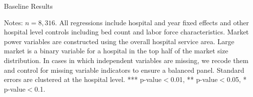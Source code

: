 \documentclass[12pt]{article}
\begin{document}
\setlength{\captionmargin}{.5 \textwidth} \addtolength{\captionmargin}{-.5\wd\gfxbox}
\begin{table}[!h]
\centering
\caption{Baseline Results}
\label{tab:baselineresults}
\usebox{\gfxbox}
\par
\begin{minipage}{\wd\gfxbox}
\footnotesize
Notes: $n=8,316$.  All regressions include hospital and year fixed effects and other hospital level controls including bed count and labor force characteristics.  Market power variables are constructed using the overall hospital service area.  Large market is a binary variable for a hospital in the top half of the market size distribution.  In cases in which independent variables are missing, we recode them and control for missing variable indicators to ensure a balanced panel.  Standard errors are clustered at the hospital level.  *** p-value$<$0.01, ** p-value$<$0.05, * p-value$<$0.1.
\end{minipage}
\end{table}
\end{document}
